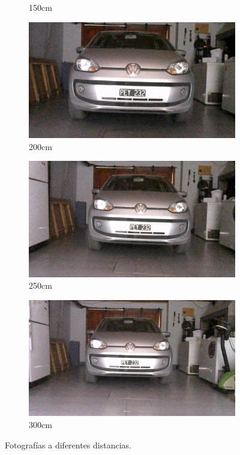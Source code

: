 \begin{figure}[bth]
\begin{subfigure}{.3\textwidth}
        \caption{150cm}
    \end{subfigure}
    \begin{subfigure}{.3\textwidth}
        \centering
        \includegraphics[width=\textwidth]{imgs/test-distancia/0_200.jpg}
        \caption{200cm}
    \end{subfigure}
    \begin{subfigure}{.3\textwidth}
        \centering
        \includegraphics[width=\textwidth]{imgs/test-distancia/0_250.jpg}
        \caption{250cm}
    \end{subfigure}
    \begin{subfigure}{.3\textwidth}
        \centering
        \includegraphics[width=\textwidth]{imgs/test-distancia/0_300.jpg}
        \caption{300cm}
    \end{subfigure}
    \caption{Fotografías a diferentes distancias.}
    \label{fig:fotos-distancia}
\end{figure}

